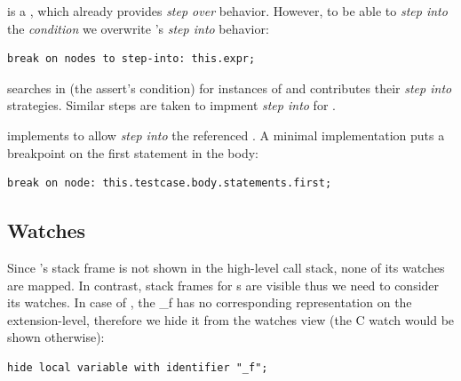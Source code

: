  is a , which
already provides \emph{step over} behavior. However, to be able to 
\emph{step into} the \emph{condition} we overwrite 's 
\emph{step into} behavior: 
\begin{lstlisting}[language=debuggerDSL,frame=single]
break on nodes to step-into: this.expr;
\end{lstlisting}

 searches in  (the assert's condition)
for instances of  and contributes their 
\emph{step into} strategies. Similar steps are taken to impment \emph{step into} 
for .

 implements  to allow 
\emph{step into} the referenced . A  
minimal implementation puts
a breakpoint on the first statement in the  body:
\begin{lstlisting}[language=debuggerDSL,frame=single]
break on node: this.testcase.body.statements.first;
\end{lstlisting}

\subsection{Watches} 

Since 's  stack frame is not shown in the high-level
call stack, none of its watches are mapped.
In contrast,  stack frames for s are visible thus we need
to consider its watches. In case of , the 
 \_f has no corresponding representation on
the extension-level, therefore we hide it from the watches view (the C watch
would be shown otherwise):

\begin{lstlisting}[frame=single,language=debuggerDSL]
hide local variable with identifier "_f";
\end{lstlisting}